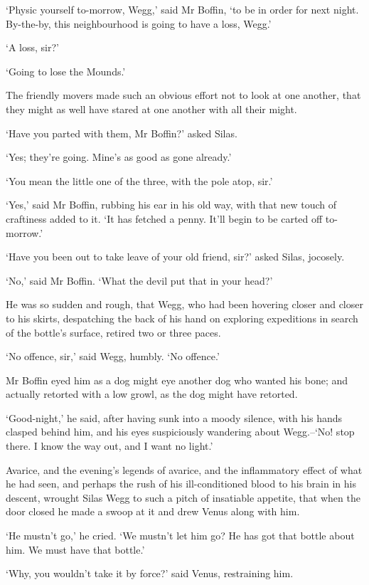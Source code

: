 ‘Physic yourself to-morrow, Wegg,’ said Mr Boffin, ‘to be in order
for next night. By-the-by, this neighbourhood is going to have a loss,
Wegg.’

‘A loss, sir?’

‘Going to lose the Mounds.’

The friendly movers made such an obvious effort not to look at one
another, that they might as well have stared at one another with all
their might.

‘Have you parted with them, Mr Boffin?’ asked Silas.

‘Yes; they’re going. Mine’s as good as gone already.’

‘You mean the little one of the three, with the pole atop, sir.’

‘Yes,’ said Mr Boffin, rubbing his ear in his old way, with that new
touch of craftiness added to it. ‘It has fetched a penny. It’ll begin to
be carted off to-morrow.’

‘Have you been out to take leave of your old friend, sir?’ asked Silas,
jocosely.

‘No,’ said Mr Boffin. ‘What the devil put that in your head?’

He was so sudden and rough, that Wegg, who had been hovering closer
and closer to his skirts, despatching the back of his hand on exploring
expeditions in search of the bottle’s surface, retired two or three
paces.

‘No offence, sir,’ said Wegg, humbly. ‘No offence.’

Mr Boffin eyed him as a dog might eye another dog who wanted his bone;
and actually retorted with a low growl, as the dog might have retorted.

‘Good-night,’ he said, after having sunk into a moody silence, with
his hands clasped behind him, and his eyes suspiciously wandering about
Wegg.--‘No! stop there. I know the way out, and I want no light.’

Avarice, and the evening’s legends of avarice, and the inflammatory
effect of what he had seen, and perhaps the rush of his ill-conditioned
blood to his brain in his descent, wrought Silas Wegg to such a pitch of
insatiable appetite, that when the door closed he made a swoop at it and
drew Venus along with him.

‘He mustn’t go,’ he cried. ‘We mustn’t let him go? He has got that
bottle about him. We must have that bottle.’

‘Why, you wouldn’t take it by force?’ said Venus, restraining him.

